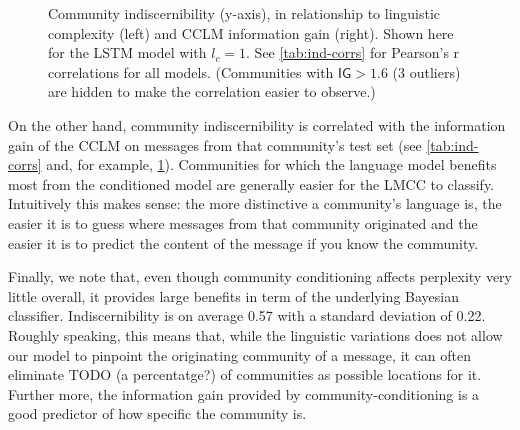 \documentclass[11pt]{article}
\newcommand\bn[1]{\todo[backgroundcolor=green!10]{BN: #1}}
\newcommand\Ppl{\mathsf{Ppl}}
\newcommand\IG{\mathsf{IG}}
\newcommand\Ind{\mathsf{Ind}}
\begin{document}
\begin{figure}
  \caption{%
    Community indiscernibility (y-axis), 
    in relationship to linguistic complexity (left) and 
    CCLM information gain (right). Shown here for the LSTM
    model with $l_c=1$. See \cref{tab:ind-corrs} for 
    Pearson's r correlations for all models.
    (Communities with \(\IG > 1.6\) (3 outliers) are hidden to make the correlation easier to observe.)
  }
  \label{fig:cclm-lmcc-ppl}
\end{figure}



On the other hand, community indiscernibility is correlated with
the information gain of the CCLM
on messages from that community's test set
(see \cref{tab:ind-corrs} and, for example, \cref{fig:cclm-lmcc-ppl}).
Communities for which the language model benefits most from 
the conditioned model are generally easier for the LMCC to classify.
Intuitively this makes sense:
the more distinctive a community's language is,
the easier it is to guess where messages from that community originated
and the easier it is to predict the content of the message if you know the community.

Finally, we note that, even though community conditioning affects
perplexity very little overall, it provides large benefits in term of
the underlying Bayesian classifier. Indiscernibility is on average
\num{0.57} with a standard deviation of \num{0.22}. Roughly speaking, this means
that, while the linguistic variations does not allow our model to
pinpoint the originating community of a message, it can often
eliminate TODO (a percentatge?) of communities as possible locations \bn{43\%?}
for it. Further more, the information gain provided by
community-conditioning is a good predictor of how specific the
community is.
\end{document}

